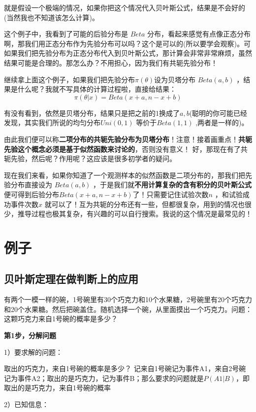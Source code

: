 \documentclass[12pt]{article}
\begin{document}
就是假设一个极端的情况，如果你把这个情况代入贝叶斯公式，结果是不会好的(当然我也不知道该怎么计算)。

这个例子中，我看到了可能的后验分布是 $Beta$ 分布，看起来感觉有点像正态分布啊，那我们用正态分布作为先验分布可以吗？这个是可以的(所以要学会观察)。可如果我们把先验分布为正态分布代入到贝叶斯公式，那计算会非常非常麻烦，虽然结果可能是合理的。那怎么办？不用担心，因为我们有共轭先验分布！

继续拿上面这个例子，如果我们把先验分布$\pi(\theta)$设为贝塔分布 $Beta(a,b)$ ，结果是什么呢？我就不写具体的计算过程啦，直接给结果：
$$
\pi(\theta|x) = Beta(x + a, n - x + b)
$$

有没有看到，依然是贝塔分布，结果只是把之前的1换成了$a,b$(聪明的你可能已经发现，其实我们所说的均匀分布$Uni(0,1)$ 等价于$Beta(1,1)$ ,两者是一样的)。

由此我们便可以称\textbf{二项分布的共轭先验分布为贝塔分布}！注意！接着画重点！\textbf{共轭先验这个概念必须是基于似然函数来讨论的}，否则没有意义！ 好，那现在有了共轭先验，然后呢？作用呢？这应该是很多初学者的疑问。

现在我们来看，如果你知道了一个观测样本的似然函数是二项分布的，那我们把先验分布直接设为 $Beta(a,b)$ ，于是我们就\textbf{不用计算复杂的含有积分的贝叶斯公式}便可得到后验分布$Beta(x+a, n - x + b)$了！只需要记住试验次数$n$ ，和试验成功事件次数$x$ 就可以了！互为共轭的分布还有一些，但都很复杂，用到的情况也很少，推导过程也极其复杂，有兴趣的可以自行搜索。我说的这个情况是最常见的！





\section{例子}
\subsection{贝叶斯定理在做判断上的应用}
有两个一模一样的碗，1号碗里有30个巧克力和10个水果糖，2号碗里有20个巧克力和20个水果糖。然后把碗盖住。随机选择一个碗，从里面摸出一个巧克力。问题：这颗巧克力来自1号碗的概率是多少？

\textbf{第1步，分解问题}

1）要求解的问题：

取出的巧克力，来自1号碗的概率是多少？
记来自1号碗记为事件A1，来自2号碗记为事件A2；取出的是巧克力，记为事件B；那么要求的问题就是$P(A1|B)$，即取出的是巧克力，来自1号碗的概率

2）已知信息：
\end{document}
